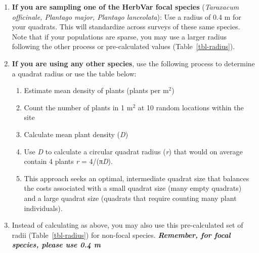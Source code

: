 \documentclass[
  letterpaper,
  oneside,
  open=any]{scrbook}
\providecommand{\tightlist}{%
  \setlength{\itemsep}{0pt}\setlength{\parskip}{0pt}}\usepackage{longtable,booktabs,array}
\begin{document}
\begin{enumerate}
\def\labelenumi{\alph{enumi}.}
\item
  \textbf{If you are sampling one of the HerbVar focal species}
  (\emph{Taraxacum officinale, Plantago major, Plantago lanceolata}):
  Use a radius of 0.4 m for your quadrats. This will standardize across
  surveys of these same species. Note that if your populations are
  sparse, you may use a larger radius following the other process or
  pre-calculated values (Table~\ref{tbl-radius}).
\item
  \textbf{If you are using any other species}, use the following process
  to determine a quadrat radius or use the table below:

  \begin{enumerate}
  \def\labelenumii{\arabic{enumii}.}
  \tightlist
  \item
    Estimate mean density of plants (plants per m\(^2\))
  \item
    Count the number of plants in 1 m\(^2\) at 10 random locations
    within the site
  \item
    Calculate mean plant density (\emph{\emph{D}})
  \item
    Use \emph{\emph{D}} to calculate a circular quadrat radius
    (\emph{r}) that would on average contain 4 plants \emph{r} =
    4/(π\emph{\emph{D}}).
  \item
    This approach seeks an optimal, intermediate quadrat size that
    balances the costs associated with a small quadrat size (many empty
    quadrats) and a large quadrat size (quadrats that require counting
    many plant individuals).
  \end{enumerate}
\item
  Instead of calculating as above, you may also use this pre-calculated
  set of radii (Table~\ref{tbl-radius}) for non-focal species.
  \textbf{\emph{Remember, for focal species, please use 0.4 m}}
\end{enumerate}
\end{document}
